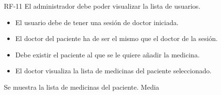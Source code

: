 {RF-11}
{El administrador debe poder visualizar la lista de usuarios.}
{	\begin{itemize}
	\def\labelenumi{\arabic{enumi}.}
	\tightlist
	\item El usuario debe de tener una sesión de doctor iniciada.
	\item El doctor del paciente ha de ser el mismo que el doctor de la sesión.
	\item Debe existir el paciente al que se le quiere añadir la medicina.
	\end{itemize}}
{
	\begin{itemize}
	\def\labelenumi{\arabic{enumi}.}
	\tightlist
    \item El doctor visualiza la lista de medicinas del paciente seleccionado.
    \end{itemize}
}
{Se muestra la lista de medicinas del paciente.}
{}
{Media}


